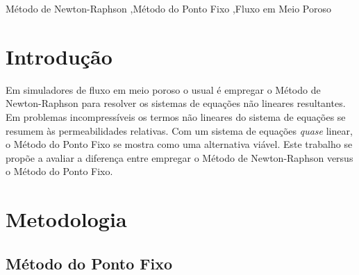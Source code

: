 \documentclass[final,5p]{elsarticle}
\numberwithin{equation}{section}
\begin{document}
\begin{frontmatter}
\begin{abstract}
\end{abstract}




\begin{keyword}
    Método de Newton-Raphson \sep Método do Ponto Fixo \sep Fluxo em Meio Poroso



\end{keyword}

\end{frontmatter}


\section{Introdução}

        Em simuladores de fluxo em meio poroso o usual é empregar o Método de Newton-Raphson para resolver os sistemas de equações não lineares resultantes\cite{computer2022cmg}\cite{schlumberger2009technical}. Em problemas incompressíveis os termos não lineares do sistema de equações se resumem às permeabilidades relativas. Com um sistema de equações \emph{quase} linear, o Método do Ponto Fixo se mostra como uma alternativa viável. Este trabalho se propõe a avaliar a diferença entre empregar o Método de Newton-Raphson versus o Método do Ponto Fixo.

\section{Metodologia}

    \subsection{Método do Ponto Fixo}
\end{document}
